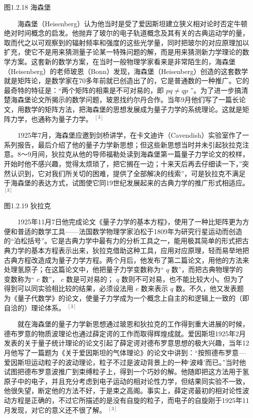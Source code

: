 \documentclass[a4paper,11pt,english]{sphinxmanual}
\begin{document}
\begin{center}图1.2.18 海森堡
\end{center}
\sphinxAtStartPar
  海森堡（Heisenberg）认为他当时是受了爱因斯坦建立狭义相对论时否定牛顿绝对时间概念的启发。他抛弃了玻尔的电子轨道概念及其有关的古典运动学的量，取而代之以可观察到的辐射频率和强度的这些光学量，同时把玻尔的对应原理加以扩充，使它不是用来猜测量子论某一特殊问题的解，而是用来猜测新力学理论的数学方案。这套新的数学方案，在当时一般物理学家看来是非常陌生的，海森堡（Heisenberg）的老师玻恩（Bonn）发现，海森堡（Heisenberg）创造的这套数学就是矩阵论，是数学家在70多年前就已创造出了的，它是普通数的一种推广。它的最奇特的特征是：“两个矩阵的相乘是不可对易的，即 \(pq \neq qp\) ”。为了进一步搞清楚海森堡论文所揭示的数学问题，玻恩找约尔丹合作。当年9月他们写了一篇长论文，用数学的矩阵方法，把海森堡的思想发展成为量子力学的系统理论。这就是矩阵力学，也通称为量子力学。 \(^{[3]}\)

\sphinxAtStartPar
  1925年7月，海森堡应邀到剑桥讲学，在卡文迪许（Cavendish）实验室作了一系列报告，最后介绍了他的量子力学新思想；但这些新思想当时并未引起狄拉克注意。8～9月间，狄拉克从他的导师福勒处读到海森堡第一篇量子力学论文的校样，开始时他不感兴趣，觉得太烦琐了，把它搁在一边；十来天后再去仔细读一下，”突然认识到，它对我们所关切的困难，提供了全部解决的线索”，可是狄拉克不满足于海森堡的表达方式，试图使它同19世纪发展起来的古典力学的推广形式相适应。 \(^{[3]}\)


\begin{center}图1.2.19 狄拉克
\end{center}
\sphinxAtStartPar
  1925年11月7日他完成论文《量子力学的基本方程》，使用了一种比矩阵更为方便和普适的数学工具——法国数学物理学家泊松于1809年为研究行星运动而创造的“泊松括号”。它是古典力学中最有力的分析工具之一，能用极其简单的形式把古典力学的基本方程表示出来，狄拉克借助这种工具，应用对应原理，轻而易举地把古典方程改造成为量子力学方程。两个月后，他发布了第二篇论文，用他的方法来处理氢原子；在这篇论文中，他把量子力学变数称为“ \(q\) 数”，而把古典物理学的变数称为“ \(c\) 数”， \(c\) 数是可对易的； \(q\) 数则不可对易，也不能比较大小。但为了得到可以同实验相比较的结果，必须设法用  \(c\) 数来表示  \(q\) 数。不久，他又发表题为《量子代数学》的论文，使量子力学成为一个概念上自主的和逻辑上一致的（即自洽的）理论体系。 \(^{[3]}\)

\sphinxAtStartPar
  就在海森堡的量子力学新思想通过玻恩和狄拉克的工作得到重大进展的时候，德布罗意的物质波理论也通过薛定谔的工作而取得辉煌成就。爱因斯坦1925年2月发表的关于量子统计理论的论文引起了薛定谔对德布罗意思想的极大兴趣，当年12月他写了一篇题为《关于爱因斯坦的气体理论》的论文中讲到：“按照德布罗意—爱因斯坦运动粒子的波动理论，粒子不过是波动背景上的一种‘波峰’而已。”当时他试图把德布罗意波推广到束缚粒子上，得到一个巧妙的解。他随即把这方法用于氢原子中的电子，并且充分考虑到电子运动的相对论性力学，但结果同实验不一致，他很失望，断定他的方法不好，于是束之高阁。事实上，薛定谔最初的相对论性波动方程是正确的，不过它所描述的是没有自旋的粒子，而电子的自旋刚于1925年11月发现，对它的意义还不很了解。 \(^{[3]}\)
\end{document}
